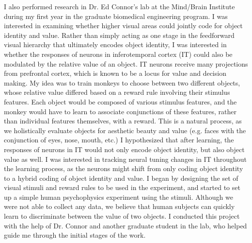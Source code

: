 \documentclass[11pt,notitlepage]{article}
\begin{document}
I also performed research in Dr. Ed Connor's lab at the Mind/Brain Institute during my first year in the graduate biomedical engineering program. I was interested in examining whether higher visual areas could jointly code for object identity and value. Rather than simply acting as one stage in the feedforward visual hierarchy that ultimately encodes object identity, I was interested in whether the responses of neurons in inferotemporal cortex (IT) could also be modulated by the relative value of an object. IT neurons receive many projections from prefrontal cortex, which is known to be a locus for value and decision making. My idea was to train monkeys to choose between two different objects, whose relative value differed based on a reward rule involving their stimulus features. Each object would be composed of various stimulus features, and the monkey would have to learn to associate conjunctions of these features, rather than individual features themselves, with a reward. This is a natural process, as we holistically evaluate objects for aesthetic beauty and value (e.g. faces with the conjunction of eyes, nose, mouth, etc.) I hypothesized that after learning, the responses of neurons in IT would not only encode object identity, but also object value as well. I was interested in tracking neural tuning changes in IT throughout the learning process, as the neurons might shift from only coding object identity to a hybrid coding of object identity and value. I began by designing the set of visual stimuli and reward rules to be used in the experiment, and started to set up a simple human psychophysics experiment using the stimuli. Although we were not able to collect any data, we believe that human subjects can quickly learn to discriminate between the value of two objects. I conducted this project with the help of Dr. Connor and another graduate student in the lab, who helped guide me through the initial stages of the work.
\end{document}
